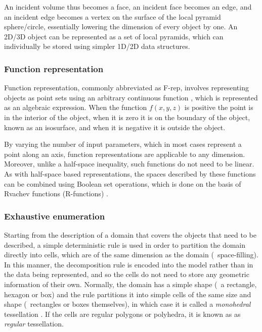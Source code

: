 An incident volume thus becomes a face, an incident face becomes an edge, and an incident edge becomes a vertex on the surface of the local pyramid sphere/circle, essentially lowering the dimension of every object by one.
An 2D/3D object can be represented as a set of local pyramids, which can individually be stored using simpler 1D/2D data structures.

\subsubsection{Function representation}

Function representation, commonly abbreviated as F-rep, involves representing objects as point sets using an arbitrary continuous function \citep{Pasko95}, which is represented as an algebraic expression.
When the function $f(x,y,z)$ is positive the point is in the interior of the object, when it is zero it is on the boundary of the object, known as an isosurface, and when it is negative it is outside the object.

By varying the number of input parameters, which in most cases represent a point along an axis, function representations are applicable to any dimension.
Moreover, unlike a half-space inequality, such functions do not need to be linear.
As with half-space based representations, the spaces described by these functions can be combined using Boolean set operations, which is done on the basis of Rvachev functions (R-functions) \citep{Rvachev63}.

\subsubsection{Exhaustive enumeration}

Starting from the description of a domain that covers the objects that need to be described, a simple deterministic rule is used in order to partition the domain directly into cells, which are of the same dimension as the domain (\ie\ space-filling).
In this manner, the decomposition rule is encoded into the model rather than in the data being represented, and so the cells do not need to store any geometric information of their own.
Normally, the domain has a simple shape (\eg\ a rectangle, hexagon or box) \citep[\S{}6.8]{ISO19123:2007} and the rule partitions it into simple cells of the same size and shape (\eg\ rectangles or boxes themselves), in which case it is called a \emph{monohedral} tessellation \citep{Boots99}.
If the cells are regular polygons or polyhedra, it is known as as \emph{regular} tessellation.

